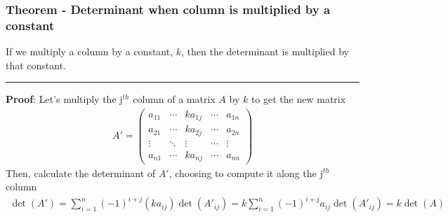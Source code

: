 \documentclass[usenames,dvipsnames,aspectratio=169,10pt]{beamer}
\numberwithin{equation}{section}
\begin{document}
\begin{frame}
\frametitle{Theorem - Determinant when column is multiplied by a constant}

If we multiply a column by a constant, $k$, then the determinant is multiplied by that constant. 
\vspace{-0.1cm}\begin{center} \textcolor{airforceblue}{\rule{0.7\textwidth}{0.3mm}} \end{center}

\textbf{Proof}: Let's multiply the j$^{th}$ column of a matrix $A$ by $k$ to get the new matrix
\begin{align*}
A' =
\begin{pmatrix}
a_{11} & \cdots & ka_{1j} & \cdots & a_{1n} \\
a_{21} & \cdots & ka_{2j} & \cdots & a_{2n} \\
\vdots & \ddots & \vdots & \cdots & \vdots \\
a_{n1} & \cdots & ka_{nj} & \cdots & a_{nn}
\end{pmatrix}
\end{align*}
Then, calculate the determinant of $A'$, choosing to compute it along the j$^{th}$ column
\begin{align*}
\det(A') = \sum_{i=1}^n (-1)^{i+j} (ka_{ij}) \det(A'_{ij}) = k\sum_{i=1}^n (-1)^{i+j} a_{ij} \det(A'_{ij}) = k \det (A)
\end{align*}
\end{frame}
\end{document}
